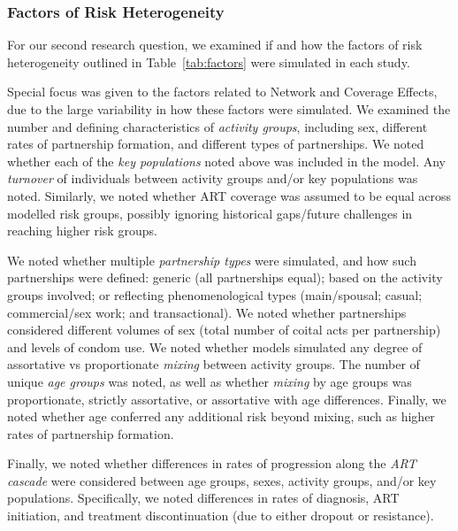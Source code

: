 \subsubsection{Factors of Risk Heterogeneity}
\label{sss:meth:factors}
For our second research question, we examined if and how
the factors of risk heterogeneity outlined in Table~\ref{tab:factors}
were simulated in each study.
\par
Special focus was given to the factors related to Network and Coverage Effects,
due to the large variability in how these factors were simulated.
We examined the number and defining characteristics of
\emph{activity groups}, including
sex, different rates of partnership formation, and different types of partnerships.
We noted whether each of the \emph{key populations} noted above
was included in the model.
Any \emph{turnover} of individuals between
activity groups and/or key populations was noted.
Similarly, we noted whether ART coverage was assumed to be
equal across modelled risk groups,
possibly ignoring historical gaps/future challenges in reaching higher risk groups.
\par
We noted whether multiple \emph{partnership types} were simulated,
and how such partnerships were defined:
generic (all partnerships equal);
based on the activity groups involved;
or reflecting phenomenological types
(main/spousal; casual; commercial/sex work; and transactional).
We noted whether partnerships considered different
volumes of sex (total number of coital acts per partnership)
and levels of condom use.
We noted whether models simulated any degree of assortative vs proportionate
\emph{mixing} between activity groups.
The number of unique \emph{age groups} was noted, as well as
whether \emph{mixing} by age groups was
proportionate, strictly assortative, or assortative with age differences.
Finally, we noted whether age conferred any additional risk beyond mixing,
such as higher rates of partnership formation.
\par
Finally, we noted whether differences in rates of progression along the \emph{ART cascade}
were considered between age groups, sexes, activity groups, and/or key populations.
Specifically, we noted differences in rates of
diagnosis, ART initiation, and treatment discontinuation (due to either dropout or resistance).
